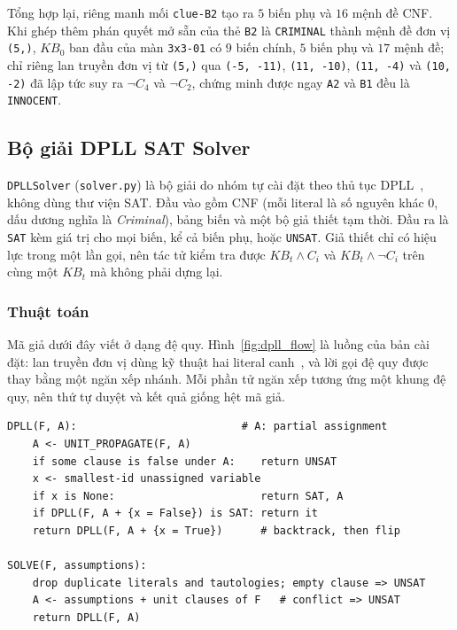\documentclass[12pt,a4paper]{article}
\begin{document}
Tổng hợp lại, riêng manh mối \texttt{clue-B2} tạo ra $5$ biến phụ và $16$ mệnh đề CNF. Khi ghép thêm phán quyết mở sẵn của thẻ \texttt{B2} là \texttt{CRIMINAL} thành mệnh đề đơn vị \texttt{(5,)}, $KB_0$ ban đầu của màn \texttt{3x3-01} có $9$ biến chính, $5$ biến phụ và $17$ mệnh đề; chỉ riêng lan truyền đơn vị từ \texttt{(5,)} qua \texttt{(-5, -11)}, \texttt{(11, -10)}, \texttt{(11, -4)} và \texttt{(10, -2)} đã lập tức suy ra $\neg C_4$ và $\neg C_2$, chứng minh được ngay \texttt{A2} và \texttt{B1} đều là \texttt{INNOCENT}.

    \subsection{Bộ giải DPLL SAT Solver}
\texttt{DPLLSolver} (\texttt{solver.py}) là bộ giải do nhóm tự cài đặt theo thủ tục DPLL~\cite{dpll1962}, không dùng thư viện SAT. Đầu vào gồm CNF (mỗi literal là số nguyên khác $0$, dấu dương nghĩa là \emph{Criminal}), bảng biến và một bộ giả thiết tạm thời. Đầu ra là \texttt{SAT} kèm giá trị cho mọi biến, kể cả biến phụ, hoặc \texttt{UNSAT}. Giả thiết chỉ có hiệu lực trong một lần gọi, nên tác tử kiểm tra được $KB_t \wedge C_i$ và $KB_t \wedge \neg C_i$ trên cùng một $KB_t$ mà không phải dựng lại.

\subsubsection{Thuật toán}
Mã giả dưới đây viết ở dạng đệ quy. Hình~\ref{fig:dpll_flow} là luồng của bản cài đặt: lan truyền đơn vị dùng kỹ thuật hai literal canh~\cite{chaff2001}, và lời gọi đệ quy được thay bằng một ngăn xếp nhánh. Mỗi phần tử ngăn xếp tương ứng một khung đệ quy, nên thứ tự duyệt và kết quả giống hệt mã giả.

\begin{lstlisting}[basicstyle=\ttfamily\footnotesize,frame=single,columns=fullflexible]
DPLL(F, A):                          # A: partial assignment
    A <- UNIT_PROPAGATE(F, A)
    if some clause is false under A:    return UNSAT
    x <- smallest-id unassigned variable
    if x is None:                       return SAT, A
    if DPLL(F, A + {x = False}) is SAT: return it
    return DPLL(F, A + {x = True})      # backtrack, then flip

SOLVE(F, assumptions):
    drop duplicate literals and tautologies; empty clause => UNSAT
    A <- assumptions + unit clauses of F   # conflict => UNSAT
    return DPLL(F, A)
\end{lstlisting}
\end{document}
